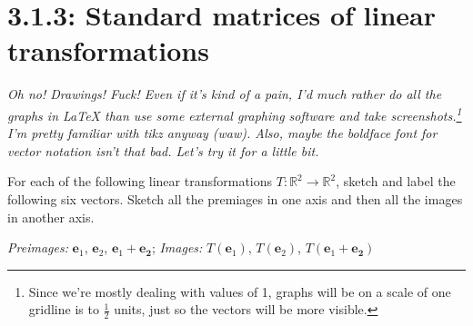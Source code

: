 \documentclass{article}
\begin{document}
\section*{3.1.3: Standard matrices of linear transformations}
\textit{Oh no! Drawings! Fuck! Even if it's kind of a pain, I'd much rather do all the graphs in \LaTeX{} than use some external graphing software and take screenshots.\footnote{Since we're mostly dealing with values of 1, graphs will be on a scale of one gridline is to \(\frac{1}{2}\) units,
just so the vectors will be more visible.} I'm pretty familiar with tikz anyway (waw). Also, maybe the boldface 
font for vector notation isn't that bad. Let's try it for a little bit. }
\begin{center}
    \colorbox{CornflowerBlue!50}{
    \begin{minipage}[c]{0.9\textwidth}
        \centering
        For each of the following linear transformations \(T: \mathbb{R}^2 \to \mathbb{R}^2\), sketch and label the following six vectors. Sketch all the premiages in one axis and then all the images in another axis.\par 
        \textit{Preimages: } \(\mathbf{e}_1\), \(\mathbf{e}_2\), \(\mathbf{e}_1 + \mathbf{e_2}\)\hspace{5pt};\hspace{5pt} \textit{Images: } \(T(\mathbf{e}_1)\), \(T(\mathbf{e}_2)\), \(T(\mathbf{e}_1 + \mathbf{e_2})\)
    \end{minipage}
    }
\end{center}
\end{document}
